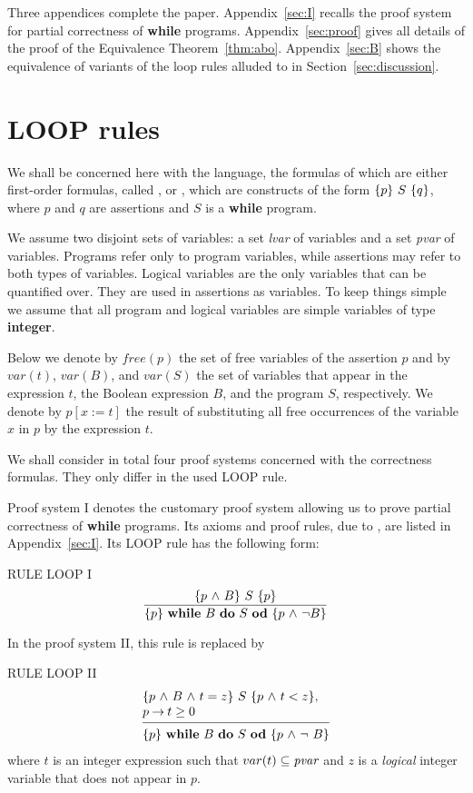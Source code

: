 \documentclass[manuscript, screen, review]{acmart}
\begin{document}
Three appendices complete the paper.
Appendix~\ref{sec:I} recalls the proof system for partial
correctness of {\bf while} programs.
Appendix~\ref{sec:proof} gives all details of the proof of the 
Equivalence Theorem~\ref{thm:abo}.
Appendix~\ref{sec:B} shows the equivalence of variants of the loop rules
alluded to in Section~\ref{sec:discussion}.


\section{LOOP rules}
\label{sec:loop-rules}

We shall be concerned here with the language, the formulas of
which are either first-order formulas, called , or
, which are constructs of the form $\mbox{$\{{p}\}\ {S}\ \{{q}\}$}$,
where $p$ and $q$ are assertions and $S$ is a \textbf{while} program.

We assume two disjoint sets of variables: a set \emph{lvar} of
 variables and a set \emph{pvar} of 
variables. Programs refer only to program variables, while assertions
may refer to both types of variables.  Logical variables are the only
variables that can be quantified over. They are used in assertions as
 variables.
To keep things simple we assume that all program and logical variables
are simple variables of  type \textbf{integer}.

Below we denote by $\mathit{free}(p)$
the set of free variables of the assertion $p$ and by $var(t)$, $var(B)$, and $var(S)$ 
the set of variables that appear in the
expression $t$, the Boolean expression $B$, and the program $S$, respectively.
We denote by $p[x:=t]$ the result of substituting all free occurrences
of the variable $x$ in $p$ by the expression $t$. 

We shall consider in total four proof systems concerned with the
correctness formulas. They only differ in the used LOOP rule.

Proof system I denotes the customary proof system allowing us to prove 
partial correctness of {\bf while} programs.  
Its axioms and proof rules, due to \cite{Hoa69}, are listed in Appendix~\ref{sec:I}.
Its LOOP rule has the following form:
\III

\NI
RULE LOOP I
\[ 
 \frac{ \mbox{$\{{p \mbox{$\ \wedge\ $} B}\}\ {S}\ \{{p}\}$}                }
      { \mbox{$\{{p}\}\ {\mbox{$\mbox{{\bf while}\ } {B}\ \mbox{{\bf do}\ } {S}\ \mbox{{\bf od}}$}}\ \{{p \mbox{$\ \wedge\ $} \neg B}\}$}  }
\]
\III


In the proof system II, this rule  is replaced by
\III

\NI
RULE LOOP II
\[
 \begin{array}{l}
  \HT{p \A B \A t=z}{S}{p \A t<z},          \\
  p \ra t \geq 0                           \\
  [-\medskipamount]
  \hrulefill                                \\
  \HT{p}{\WDD{B}{S}}{p \A \neg\ B}
 \end{array}
\]
where $t$ is an integer expression such that  $var(t)\subseteq \mbox{\it pvar}$
and $z$ is a \emph{logical} integer variable that does not appear in $p$.
\III
\end{document}
